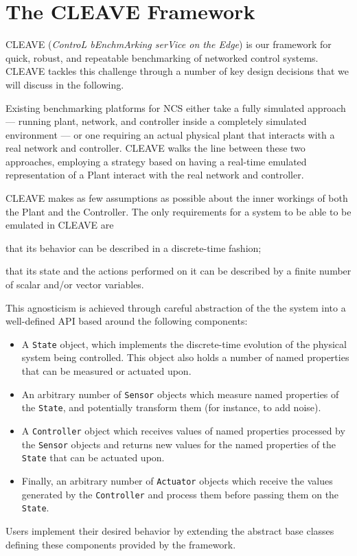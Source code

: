 \pagebreak
\section{The CLEAVE Framework}\label{sec:cleave}

CLEAVE (\emph{ControL bEnchmArking serVice on the Edge}) is our framework for quick, robust, and repeatable benchmarking of networked control systems.
CLEAVE tackles this challenge through a number of key design decisions that we will discuss in the following.

\begin{description}[wide]
    \item[Emulation approach.] 
    Existing benchmarking platforms for NCS either take a fully simulated approach --- running plant, network, and controller inside a completely simulated environment --- or one requiring an actual physical plant that interacts with a real network and controller.
    CLEAVE walks the line between these two approaches, employing a strategy based on having a real-time emulated representation of a Plant interact with the real network and controller.
    \item[Plant- and Controller-agnosticism.] 
    CLEAVE makes as few assumptions as possible about the inner workings of both the Plant and the Controller. 
    The only requirements for a system to be able to be emulated in CLEAVE are
    \begin{enumerate*}[itemjoin*={{ and }}]
        \item that its behavior can be described in a discrete-time fashion;
        \item that its state and the actions performed on it can be described by a finite number of scalar and/or vector variables.
    \end{enumerate*} 


    This agnosticism is achieved through careful abstraction of the the system into a well-defined API based around the following components:
    \begin{itemize}
        \item A \texttt{State} object, which implements the discrete-time evolution of the physical system being controlled.
        This object also holds a number of named properties that can be measured or actuated upon.
        \item An arbitrary number of \texttt{Sensor} objects which measure named properties of the \texttt{State}, and potentially transform them (for instance, to add noise).
        \item A \texttt{Controller} object which receives values of named properties processed by the \texttt{Sensor} objects and returns new values for the named properties of the \texttt{State} that can be actuated upon.
        \item Finally, an arbitrary number of \texttt{Actuator} objects which receive the values generated by the \texttt{Controller} and process them before passing them on the \texttt{State}.
    \end{itemize}
    Users implement their desired behavior by extending the abstract base classes defining these components provided by the framework.
    

\end{description}
